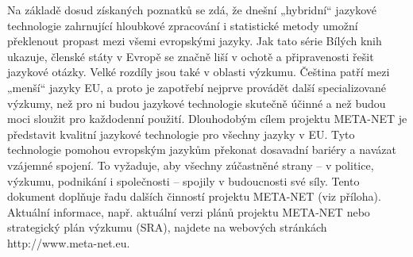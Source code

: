 \begin{multicols}{2}
Na základě dosud získaných poznatků se zdá, že dnešní „hybridní“ jazykové technologie zahrnující hloubkové zpracování i statistické metody umožní překlenout propast mezi všemi evropskými jazyky. Jak tato série Bílých knih ukazuje, členské státy v Evropě se značně liší v ochotě a připravenosti řešit jazykové otázky. Velké rozdíly jsou také v oblasti výzkumu. Čeština patří mezi „menší“ jazyky EU, a proto je zapotřebí nejprve provádět další specializované výzkumy, než pro ni budou jazykové technologie skutečně účinné a než budou moci sloužit pro každodenní použití.
Dlouhodobým cílem projektu META-NET je představit kvalitní jazykové technologie pro všechny jazyky v EU. Tyto technologie pomohou evropským jazykům překonat dosavadní bariéry a navázat vzájemné spojení. To vyžaduje, aby všechny zúčastněné strany – v politice, výzkumu, podnikání i společnosti – spojily v budoucnosti své síly.
Tento dokument doplňuje řadu dalších činností projektu META-NET (viz příloha).
Aktuální informace, např. aktuální verzi plánů projektu META-NET \cite{Meta1} nebo strategický plán výzkumu (SRA), najdete na webových stránkách http://www.meta-net.eu.
\end{multicols}
\clearpage


